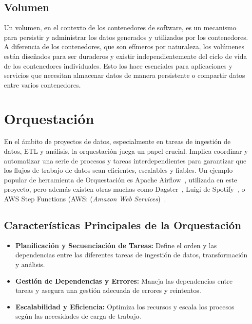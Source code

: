 \subsection{Volumen} Un volumen, en el contexto de los contenedores de software, es un mecanismo para persistir y administrar los datos generados y utilizados por los contenedores. A diferencia de los contenedores, que son efímeros por naturaleza, los volúmenes están diseñados para ser duraderos y existir independientemente del ciclo de vida de los contenedores individuales. Esto los hace esenciales para aplicaciones y servicios que necesitan almacenar datos de manera persistente o compartir datos entre varios contenedores.

\section{Orquestación}

En el ámbito de proyectos de datos, especialmente en tareas de ingestión de datos, ETL y análisis, la orquestación juega un papel crucial. Implica coordinar y automatizar una serie de procesos y tareas interdependientes para garantizar que los flujos de trabajo de datos sean eficientes, escalables y fiables. Un ejemplo popular de herramienta de Orquestación es Apache Airflow~\cite{airflow}, utilizada en este proyecto, pero además existen otras muchas como Dagster~\cite {dagster}, Luigi de Spotify~\cite{Luigi}, o AWS Step Functions (AWS: (\textit{Amazon Web Services})~\cite{aws_step_functions}.

\subsection{Características Principales de la Orquestación}
\begin{itemize}
    \item \textbf{Planificación y Secuenciación de Tareas:} Define el orden y las dependencias entre las diferentes tareas de ingestión de datos, transformación y análisis.
    \item \textbf{Gestión de Dependencias y Errores:} Maneja las dependencias entre tareas y asegura una gestión adecuada de errores y reintentos.
    \item \textbf{Escalabilidad y Eficiencia:} Optimiza los recursos y escala los procesos según las necesidades de carga de trabajo.
\end{itemize}

